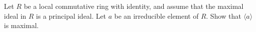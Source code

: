 \documentclass[12pt,letterpaper,boxed]{hmcpset}
\begin{document}
\begin{solution}
\end{solution}

\clearpage

\begin{problem}[18.6.2]
Let $R$ be a local commutative ring with identity, and assume that the maximal ideal in $R$ is a principal ideal. Let $a$ be an irreducible element of $R$. Show that $\langle a \rangle$ is maximal.
\end{problem}

\begin{solution}
\end{solution}
\end{document}
